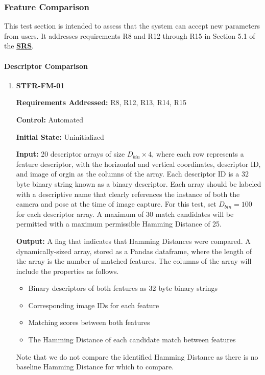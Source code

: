 \documentclass[12pt, titlepage]{article}
\begin{document}
\subsubsection{Feature Comparison}

This test section is intended to assess that the system can accept new parameters from users. It addresses 
requirements R8 and R12 through R15 in Section 5.1 of the 
\textbf{\href{https://github.com/KiranSingh15/CAS-741-Image-Correspondences/blob/main/docs/SRS/SRS.pdf}
{SRS}}. 
		
\paragraph{Descriptor Comparison}
\begin{enumerate}
\item \hypertarget{STFR-FM-01}{\textbf{STFR-FM-01}\\}
\textbf{Requirements Addressed:} R8, R12, R13, R14, R15

\textbf{Control:} Automated		

\textbf{Initial State:} Uninitialized

\textbf{Input:} 20 descriptor arrays of size $D_{bin} \times 4$, where each row represents a feature descriptor, with the horizontal and vertical coordinates, descriptor ID, and image of orgin as the columns of the array. Each descriptor ID is a 32 byte binary string known as a binary descriptor. Each array should be labeled with a descriptive name that clearly references the instance of both the camera and pose at the time of image capture. For this test, set $D_{bin} = 100$ for each descriptor array. A maximum of 30 match candidates will be permitted with a maximum permissible Hamming Distance of 25.

\textbf{Output:} A flag that indicates that Hamming Distances were compared. A dynamically-sized array, stored as a Pandas dataframe, where the length of the array is the number of matched features. The columns of the array will include the properties as follows.
\begin{itemize}
\item Binary descriptors of both features as 32 byte binary strings
\item Corresponding image IDs for each feature
\item Matching scores between both features
\item The Hamming Distance of each candidate match between features
\end{itemize}
Note that we do not compare the identified Hamming Distance as there is no baseline Hamming Distance for which to compare. \\


\end{enumerate}
\end{document}
